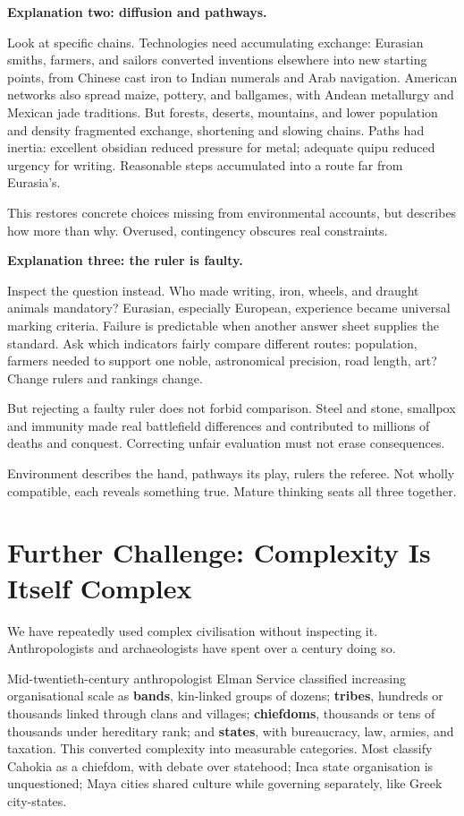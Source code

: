 \textbf{Explanation two: diffusion and pathways.}

Look at specific chains. Technologies need accumulating exchange: Eurasian smiths, farmers, and sailors converted inventions elsewhere into new starting points, from Chinese cast iron to Indian numerals and Arab navigation. American networks also spread maize, pottery, and ballgames, with Andean metallurgy and Mexican jade traditions. But forests, deserts, mountains, and lower population and density fragmented exchange, shortening and slowing chains. Paths had inertia: excellent obsidian reduced pressure for metal; adequate quipu reduced urgency for writing. Reasonable steps accumulated into a route far from Eurasia's.

This restores concrete choices missing from environmental accounts, but describes how more than why. Overused, contingency obscures real constraints.

\textbf{Explanation three: the ruler is faulty.}

Inspect the question instead. Who made writing, iron, wheels, and draught animals mandatory? Eurasian, especially European, experience became universal marking criteria. Failure is predictable when another answer sheet supplies the standard. Ask which indicators fairly compare different routes: population, farmers needed to support one noble, astronomical precision, road length, art? Change rulers and rankings change.

But rejecting a faulty ruler does not forbid comparison. Steel and stone, smallpox and immunity made real battlefield differences and contributed to millions of deaths and conquest. Correcting unfair evaluation must not erase consequences.

Environment describes the hand, pathways its play, rulers the referee. Not wholly compatible, each reveals something true. Mature thinking seats all three together.

\section[Further Challenge: Complexity Is Complex]{Further Challenge: Complexity Is Itself Complex}
We have repeatedly used complex civilisation without inspecting it. Anthropologists and archaeologists have spent over a century doing so.

Mid-twentieth-century anthropologist Elman Service classified increasing organisational scale as \textbf{bands}, kin-linked groups of dozens; \textbf{tribes}, hundreds or thousands linked through clans and villages; \textbf{chiefdoms}, thousands or tens of thousands under hereditary rank; and \textbf{states}, with bureaucracy, law, armies, and taxation. This converted complexity into measurable categories. Most classify Cahokia as a chiefdom, with debate over statehood; Inca state organisation is unquestioned; Maya cities shared culture while governing separately, like Greek city-states.

